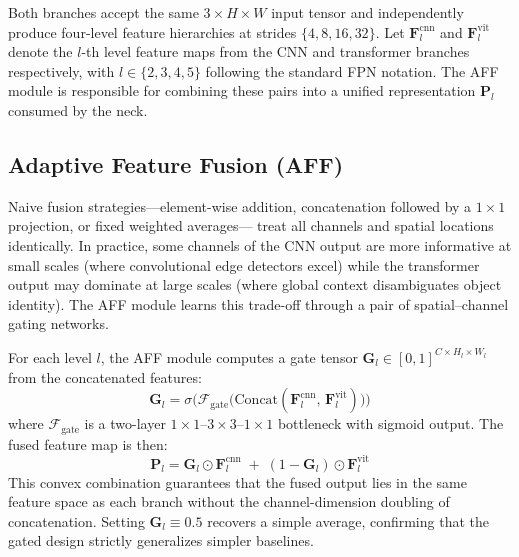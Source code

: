Both branches accept the same $3\times H\times W$ input tensor and
independently produce four-level feature hierarchies at strides
$\{4, 8, 16, 32\}$. Let $\mathbf{F}^{\text{cnn}}_l$ and
$\mathbf{F}^{\text{vit}}_l$ denote the $l$-th level feature maps
from the CNN and transformer branches respectively, with
$l \in \{2,3,4,5\}$ following the standard FPN notation. The AFF
module is responsible for combining these pairs into a unified
representation $\mathbf{P}_l$ consumed by the neck.

\subsection{Adaptive Feature Fusion (AFF)}
\label{sec:aff}

Naive fusion strategies---element-wise addition, concatenation
followed by a $1\times1$ projection, or fixed weighted averages---
treat all channels and spatial locations identically. In practice,
some channels of the CNN output are more informative at small scales
(where convolutional edge detectors excel) while the transformer
output may dominate at large scales (where global context
disambiguates object identity). The AFF module learns this
trade-off through a pair of spatial--channel gating networks.

For each level $l$, the AFF module computes a gate tensor
$\mathbf{G}_l \in [0,1]^{C \times H_l \times W_l}$ from the
concatenated features:
\begin{equation}
  \mathbf{G}_l = \sigma\!\bigl(
    \mathcal{F}_{\text{gate}}\bigl(
      \text{Concat}(\mathbf{F}^{\text{cnn}}_l,\,
                     \mathbf{F}^{\text{vit}}_l)
    \bigr)
  \bigr)
  \label{eq:aff}
\end{equation}
where $\mathcal{F}_{\text{gate}}$ is a two-layer
$1\times1$--$3\times3$--$1\times1$ bottleneck with sigmoid output.
The fused feature map is then:
\begin{equation}
  \mathbf{P}_l =
    \mathbf{G}_l \odot \mathbf{F}^{\text{cnn}}_l
    \;+\;
    (1 - \mathbf{G}_l) \odot \mathbf{F}^{\text{vit}}_l
  \label{eq:aff_merge}
\end{equation}
This convex combination guarantees that the fused output lies in the
same feature space as each branch without the channel-dimension
doubling of concatenation.  Setting $\mathbf{G}_l \equiv 0.5$
recovers a simple average, confirming that the gated design strictly
generalizes simpler baselines.
